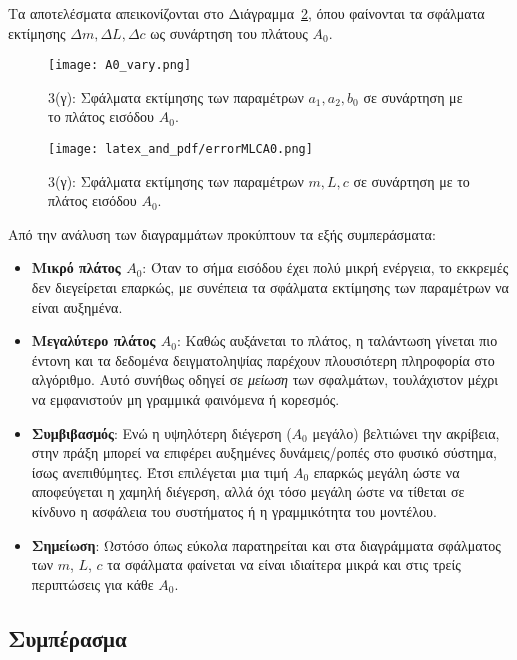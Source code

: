 \documentclass[a4paper,12pt]{report}
\begin{document}
Τα αποτελέσματα απεικονίζονται στο Διάγραμμα~\ref{fig:ampVaryMLC}, όπου φαίνονται τα σφάλματα εκτίμησης \(\Delta m,\Delta L,\Delta c\) ως συνάρτηση του πλάτους \(A_0\).

\begin{figure}[H]
    \centering
    \texttt{[image: A0\_vary.png]}
    \caption{3(γ): Σφάλματα εκτίμησης των παραμέτρων $a_1,a_2,b_0$ σε συνάρτηση με το πλάτος εισόδου $A_0$.}
    \label{fig:ampVary}
\end{figure}

\begin{figure}[H]
    \centering
    \texttt{[image: latex\_and\_pdf/errorMLCA0.png]}
    \caption{3(γ): Σφάλματα εκτίμησης των παραμέτρων $m,L,c$ σε συνάρτηση με το πλάτος εισόδου $A_0$.}
    \label{fig:ampVaryMLC}
\end{figure}


\noindent
Από την ανάλυση των διαγραμμάτων προκύπτουν τα εξής συμπεράσματα:
\begin{itemize}
    \item \textbf{Μικρό πλάτος \(A_0\)}: Όταν το σήμα εισόδου έχει πολύ μικρή ενέργεια, το εκκρεμές δεν διεγείρεται επαρκώς, με συνέπεια τα σφάλματα εκτίμησης των παραμέτρων να είναι αυξημένα.
    \item \textbf{Μεγαλύτερο πλάτος \(A_0\)}: Καθώς αυξάνεται το πλάτος, η ταλάντωση γίνεται πιο έντονη και τα δεδομένα δειγματοληψίας παρέχουν πλουσιότερη πληροφορία στο αλγόριθμο. Αυτό συνήθως οδηγεί σε \emph{μείωση} των σφαλμάτων, τουλάχιστον μέχρι να εμφανιστούν μη γραμμικά φαινόμενα ή κορεσμός.
    \item \textbf{Συμβιβασμός}: Ενώ η υψηλότερη διέγερση (\(A_0\) μεγάλο) βελτιώνει την ακρίβεια, στην πράξη μπορεί να επιφέρει αυξημένες δυνάμεις/ροπές στο φυσικό σύστημα, ίσως ανεπιθύμητες. Έτσι επιλέγεται μια τιμή \(A_0\) επαρκώς μεγάλη ώστε να αποφεύγεται η χαμηλή διέγερση, αλλά όχι τόσο μεγάλη ώστε να τίθεται σε κίνδυνο η ασφάλεια του συστήματος ή η γραμμικότητα του μοντέλου.
    \item \textbf{Σημείωση}: Ωστόσο όπως εύκολα παρατηρείται και στα διαγράμματα σφάλματος των \(m\), \(L\), \(c\) τα σφάλματα φαίνεται να είναι ιδιαίτερα μικρά και στις τρείς περιπτώσεις για κάθε \(A_0\).
\end{itemize}

\subsection*{Συμπέρασμα}
\end{document}
